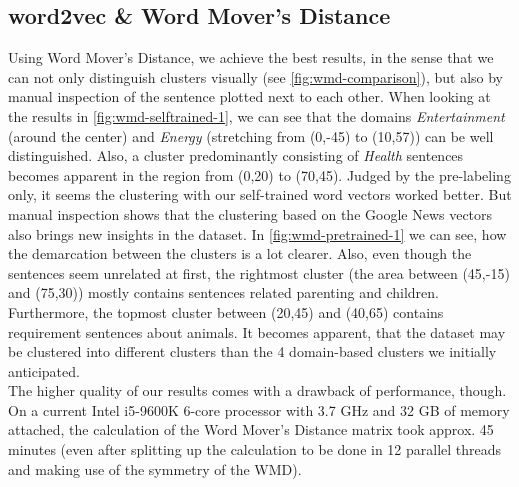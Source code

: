 \subsection{word2vec \& Word Mover's Distance} %
\label{sub:findings_wmd}
Using Word Mover's Distance, we achieve the best results, in the sense that we can not only distinguish clusters visually (see \autoref{fig:wmd-comparison}), but also by manual inspection of the sentence plotted next to each other.
When looking at the results in \autoref{fig:wmd-selftrained-1}, we can see that the domains \textit{Entertainment} (around the center) and \textit{Energy} (stretching from (0,-45) to (10,57)) can be well distinguished. Also, a cluster predominantly consisting of \textit{Health} sentences becomes apparent in the region from (0,20) to (70,45).
Judged by the pre-labeling only, it seems the clustering with our self-trained word vectors worked better. But manual inspection shows that the clustering based on the Google News vectors also brings new insights in the dataset. In \autoref{fig:wmd-pretrained-1} we can see, how the demarcation between the clusters is a lot clearer. Also, even though the sentences seem unrelated at first, the rightmost cluster (the area between (45,-15) and (75,30)) mostly contains sentences related parenting and children. Furthermore, the topmost cluster between (20,45) and (40,65) contains requirement sentences about animals. It becomes apparent, that the dataset may be clustered into different clusters than the 4 domain-based clusters we initially anticipated.\\

The higher quality of our results comes with a drawback of performance, though. On a current Intel i5-9600K 6-core processor with 3.7 GHz and 32 GB of memory attached, the calculation of the Word Mover's Distance matrix took approx. 45 minutes (even after splitting up the calculation to be done in 12 parallel threads and making use of the symmetry of the WMD).



